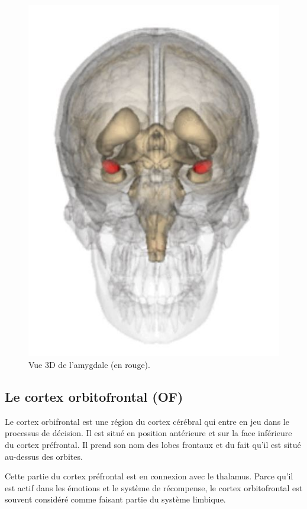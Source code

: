 \begin{figure}[th]
\centering
\includegraphics{Figures/2}
\decoRule
\caption[L'amygdale]{Vue 3D de l'amygdale (en rouge).}
\label{fig:amy}
\end{figure}


\subsection{Le cortex orbitofrontal (OF)}

Le cortex orbifrontal est une région du cortex cérébral qui entre en jeu dans le processus de décision. Il est situé en position antérieure et sur la face inférieure du cortex préfrontal. Il prend son nom des lobes frontaux et du fait qu'il est situé au-dessus des orbites.


Cette partie du cortex préfrontal est en connexion avec le thalamus. Parce qu'il est actif dans les émotions et le système de récompense, le cortex orbitofrontal est souvent considéré comme faisant partie du système limbique.\parencite{cortex}

